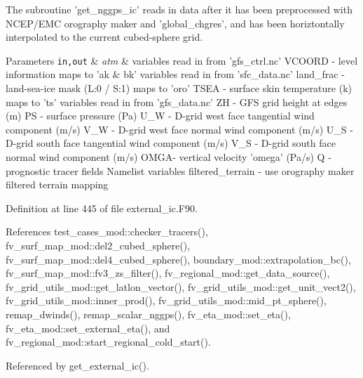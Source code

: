 The subroutine 'get\-\_\-nggps\-\_\-ic' reads in data after it has been preprocessed with N\-C\-E\-P/\-E\-M\-C orography maker and 'global\-\_\-chgres', and has been horiztontally interpolated to the current cubed-\/sphere grid. 


\begin{DoxyParams}[1]{Parameters}
\mbox{\tt in,out}  & {\em atm} & variables read in from 'gfs\-\_\-ctrl.\-nc' V\-C\-O\-O\-R\-D -\/ level information maps to 'ak \& bk' variables read in from 'sfc\-\_\-data.\-nc' land\-\_\-frac -\/ land-\/sea-\/ice mask (L\-:0 / S\-:1) maps to 'oro' T\-S\-E\-A -\/ surface skin temperature (k) maps to 'ts' variables read in from 'gfs\-\_\-data.\-nc' Z\-H -\/ G\-F\-S grid height at edges (m) P\-S -\/ surface pressure (Pa) U\-\_\-\-W -\/ D-\/grid west face tangential wind component (m/s) V\-\_\-\-W -\/ D-\/grid west face normal wind component (m/s) U\-\_\-\-S -\/ D-\/grid south face tangential wind component (m/s) V\-\_\-\-S -\/ D-\/grid south face normal wind component (m/s) O\-M\-G\-A-\/ vertical velocity 'omega' (Pa/s) Q -\/ prognostic tracer fields Namelist variables filtered\-\_\-terrain -\/ use orography maker filtered terrain mapping \\
\hline
\end{DoxyParams}


Definition at line 445 of file external\-\_\-ic.\-F90.



References test\-\_\-cases\-\_\-mod\-::checker\-\_\-tracers(), fv\-\_\-surf\-\_\-map\-\_\-mod\-::del2\-\_\-cubed\-\_\-sphere(), fv\-\_\-surf\-\_\-map\-\_\-mod\-::del4\-\_\-cubed\-\_\-sphere(), boundary\-\_\-mod\-::extrapolation\-\_\-bc(), fv\-\_\-surf\-\_\-map\-\_\-mod\-::fv3\-\_\-zs\-\_\-filter(), fv\-\_\-regional\-\_\-mod\-::get\-\_\-data\-\_\-source(), fv\-\_\-grid\-\_\-utils\-\_\-mod\-::get\-\_\-latlon\-\_\-vector(), fv\-\_\-grid\-\_\-utils\-\_\-mod\-::get\-\_\-unit\-\_\-vect2(), fv\-\_\-grid\-\_\-utils\-\_\-mod\-::inner\-\_\-prod(), fv\-\_\-grid\-\_\-utils\-\_\-mod\-::mid\-\_\-pt\-\_\-sphere(), remap\-\_\-dwinds(), remap\-\_\-scalar\-\_\-nggps(), fv\-\_\-eta\-\_\-mod\-::set\-\_\-eta(), fv\-\_\-eta\-\_\-mod\-::set\-\_\-external\-\_\-eta(), and fv\-\_\-regional\-\_\-mod\-::start\-\_\-regional\-\_\-cold\-\_\-start().



Referenced by get\-\_\-external\-\_\-ic().

